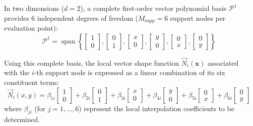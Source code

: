 \documentclass[preprint,12pt]{elsarticle}
\begin{document}
In two dimensions ($d=2$), a complete first-order vector polynomial basis $\mathcal{P}^1$ provides 6 independent degrees of freedom ($M_{\mathrm{supp}} = 6$ support nodes per evaluation point):
\begin{equation}
\mathcal{P}^1 = \operatorname{span} \left\{ 
\begin{bmatrix} 1 \\ 0 \end{bmatrix}, 
\begin{bmatrix} 0 \\ 1 \end{bmatrix}, 
\begin{bmatrix} x \\ 0 \end{bmatrix}, 
\begin{bmatrix} y \\ 0 \end{bmatrix}, 
\begin{bmatrix} 0 \\ x \end{bmatrix}, 
\begin{bmatrix} 0 \\ y \end{bmatrix} 
\right\}
\label{eq:complete_P1_basis_vectors}
\end{equation}

Using this complete basis, the local vector shape function $\vec{N}_i(\mathbf{x})$ associated with the $i$-th support node is expressed as a linear combination of its six constituent terms:
\begin{equation}
\vec{N}_i(x, y) = \beta_{1i} \begin{bmatrix} 1 \\ 0 \end{bmatrix} + \beta_{2i} \begin{bmatrix} 0 \\ 1 \end{bmatrix} + \beta_{3i} \begin{bmatrix} x \\ 0 \end{bmatrix} + \beta_{4i} \begin{bmatrix} y \\ 0 \end{bmatrix} + \beta_{5i} \begin{bmatrix} 0 \\ x \end{bmatrix} + \beta_{6i} \begin{bmatrix} 0 \\ y \end{bmatrix}
\label{eq:P1_shape_function_expansion}
\end{equation}
where $\beta_{ji}$ (for $j=1, \dots, 6$) represent the local interpolation coefficients to be determined.
\end{document}

